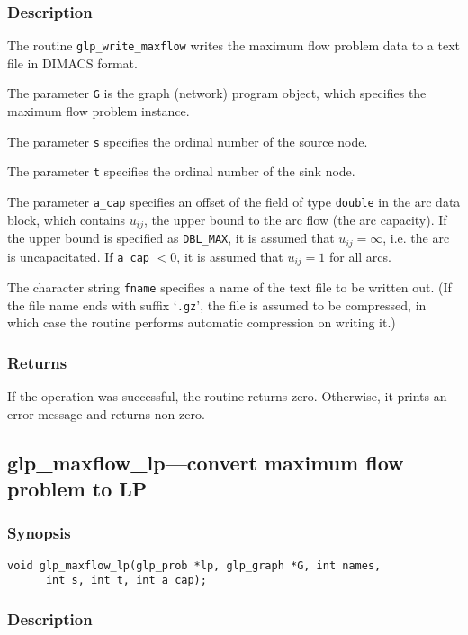 \subsubsection*{Description}

The routine \verb|glp_write_maxflow| writes the maximum flow problem
data to a text file in DIMACS format.

The parameter \verb|G| is the graph (network) program object, which
specifies the maximum flow problem instance.

The parameter \verb|s| specifies the ordinal number of the source node.

The parameter \verb|t| specifies the ordinal number of the sink node.

The parameter \verb|a_cap| specifies an offset of the field of type
\verb|double| in the arc data block, which contains $u_{ij}$, the upper
bound to the arc flow (the arc capacity). If the upper bound is
specified as \verb|DBL_MAX|, it is assumed that $u_{ij}=\infty$, i.e.
the arc is uncapacitated. If \verb|a_cap| $<0$, it is assumed that
$u_{ij}=1$ for all arcs.

The character string \verb|fname| specifies a name of the text file to
be written out. (If the file name ends with suffix `\verb|.gz|', the
file is assumed to be compressed, in which case the routine performs
automatic compression on writing it.)

\subsubsection*{Returns}

If the operation was successful, the routine returns zero. Otherwise,
it prints an error message and returns non-zero.

\subsection{glp\_maxflow\_lp---convert maximum flow problem to LP}

\subsubsection*{Synopsis}

\begin{verbatim}
void glp_maxflow_lp(glp_prob *lp, glp_graph *G, int names,
      int s, int t, int a_cap);
\end{verbatim}

\subsubsection*{Description}


